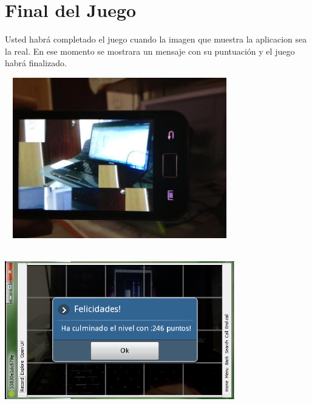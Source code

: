 \documentclass[10pt]{article}
\begin{document}
\section{Final del Juego}
	Usted habr\'a completado el juego cuando la imagen que muestra la aplicacion sea la real. En ese momento se mostrara un mensaje con su puntuaci\'on y el juego habr\'a finalizado.
	\begin{center}
	\includegraphics[height=7cm,width=10cm]{completando.jpg}
	\end{center}	
	\begin{center}
	\includegraphics[height=7cm,width=10cm]{gano.png}
	\end{center}	
		
\end{document}
